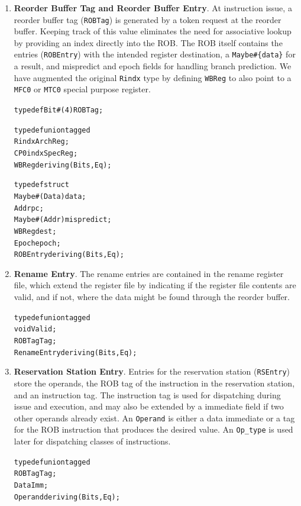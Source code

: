 \documentclass[12pt]{article}
\begin{document}
\begin{enumerate}
    \item \textbf{Reorder Buffer Tag and Reorder Buffer Entry}. At instruction issue, a reorder buffer tag (\verb=ROBTag=) is generated by a
token request at the reorder buffer. Keeping track of this value eliminates
the need for associative lookup by providing an index directly into the ROB.
The ROB itself contains the entries (\verb=ROBEntry=) with the intended
register destination, a \verb=Maybe#{data}= for a result, and mispredict and
epoch fields for handling branch prediction. We have augmented the original \verb=Rindx= type by defining \verb=WBReg= to also point to a \verb=MFC0= or \verb=MTC0= special purpose register.

    \begin{alltt}
        typedef Bit#(4) ROBTag;
        
        typedef union tagged {
          Rindx ArchReg;
          CP0indx SpecReg;
        } WBReg deriving (Bits, Eq);
        
        typedef struct {
                Maybe#(Data) data;
                Addr pc;
                Maybe#(Addr) mispredict;
                WBReg dest;
                Epoch epoch;
        } ROBEntry deriving (Bits, Eq);
    \end{alltt}
    
    \item \textbf{Rename Entry}. The rename entries are contained in the rename register file, which extend the
register file by indicating if the register file contents are valid, and if
not, where the data might be found through the reorder buffer.
    \begin{alltt}
        typedef union tagged {
            void Valid;
            ROBTag Tag;
        } RenameEntry deriving (Bits, Eq);
    \end{alltt}
    
    \item \textbf{Reservation Station Entry}. Entries for the reservation station (\verb=RSEntry=) store the operands, the
ROB tag of the instruction in the reservation station, and an instruction tag.
The instruction tag is used for dispatching during issue and execution, and
may also be extended by a immediate field if two other operands already exist.
An \verb=Operand= is either a data immediate or a tag for the ROB instruction
that produces the desired value. An \verb=Op_type= is used later for
dispatching classes of instructions.
    \begin{alltt}
        typedef union tagged {
            ROBTag Tag;
            Data Imm;
        } Operand deriving (Bits, Eq);
        

\end{alltt}
\end{enumerate}
\end{document}
